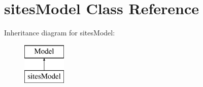 \hypertarget{classsites_model}{}\section{sites\+Model Class Reference}
\label{classsites_model}
Inheritance diagram for sites\+Model\+:\begin{figure}[H]
\begin{center}
\leavevmode
\includegraphics[height=2.000000cm]{classsites_model}
\end{center}
\end{figure}
